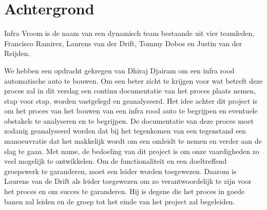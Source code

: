\section{Achtergrond}
Infra Vroom is de naam van een dynamisch team bestaande uit vier teamleden, Francisco Ramirez, Laurens van der Drift, Tommy Dobos en Justin van der Reijden.

We hebben een opdracht gekregen van Dhiraj Djairam om een infra rood automatische auto te bouwen. Om een beter zicht te krijgen voor wat betreft deze proces zal in dit verslag een continu documentatie van het proces plaats nemen, stap voor stap, worden vastgelegd en geanalyseerd. Het idee achter dit project is om het proces van het bouwen van een infra rood auto te begrijpen en eventuele obstakels te analyseren en te begrijpen. De documentatie van deze proces moet zodanig geanalyseerd worden dat bij het tegenkomen van een tegenstand  een manoeuvratie dat het makkelijk wordt om een omleidt te nemen en verder aan de slag te gaan. Met name, de bedoeling van dit project is om onze vaardigheden zo veel mogelijk te ontwikkelen. 
Om de functionaliteit en een doeltreffend groepswerk te garanderen, moet een leider worden toegewezen. Daarom is Laurens van de Drift als leider toegewezen om zo verantwoordelijk te zijn voor het proces en om succes te garanderen. Hij is degene die het proces in goede banen zal leiden en de groep tot het einde van het project zal begeleiden.
